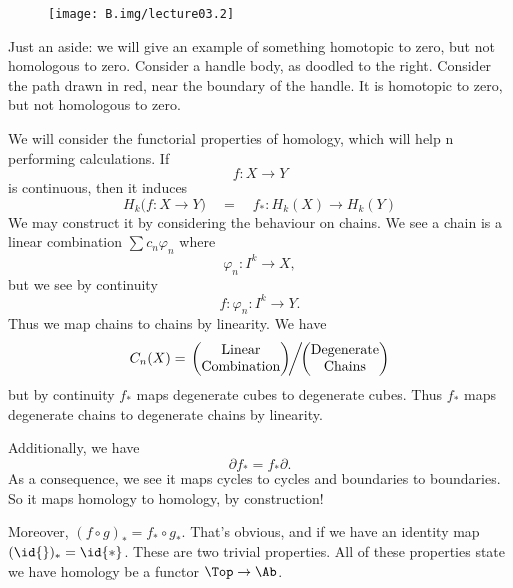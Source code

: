 \begin{wrapfigure}{r}{4pc}
  \texttt{[image: B.img/lecture03.2]}
  \vspace{-12pt}
\end{wrapfigure}
Just an aside: we will give an example of something homotopic to
zero, but not homologous to zero. Consider a handle body, as
doodled to the right. Consider the path drawn in red, near the
boundary of the handle. It is homotopic to zero, but not
homologous to zero.

We will consider the
functorial properties of homology, which will help n performing
calculations. If
\begin{equation}
f\colon X\to Y
\end{equation}
is continuous, then it induces
\begin{equation}
H_{k}\bigl(f\colon X\to Y)\quad=\quad
f_{*}\colon H_{k}(X)\to H_{k}(Y)
\end{equation}
We may construct it by considering the behaviour on chains. We
see a chain is a linear combination $\sum c_n\varphi_n$ where
\begin{equation}
\varphi_n\colon I^k\to X,
\end{equation}
but we see by continuity
\begin{equation}
f\colon\varphi_n\colon I^k\to Y.
\end{equation}
Thus we map chains to chains by 
linearity. We have
\begin{equation}
C_{n}(X) = \left.\begin{pmatrix}\mbox{Linear}\\\mbox{Combination}
\end{pmatrix}\!\right/\!\!\begin{pmatrix}\mbox{Degenerate}\\\mbox{Chains}
\end{pmatrix}
\end{equation}
but by continuity $f_{*}$ maps degenerate cubes to degenerate
cubes. Thus $f_{*}$ maps degenerate chains to degenerate chains
by linearity.

Additionally, we have
\begin{equation}
\partial f_{*}=f_{*}\partial.
\end{equation}
As a consequence, we see it maps cycles to cycles and boundaries
to boundaries. So it maps homology to homology, by construction!

Moreover, $(f\circ g)_{*}=f_{*}\circ g_{*}$. That's obvious, and
if we have an identity map $(\id{})_{*}=\id{*}$. These are two
trivial properties.
All of these properties state we have homology be a functor
$\Top\to\Ab$.

